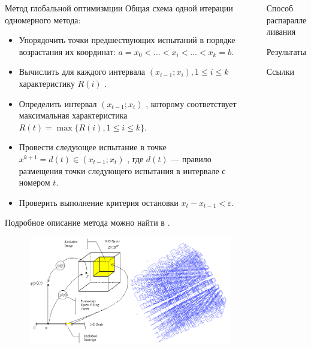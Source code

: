 \documentclass{beamer}
\begin{document}
\begin{frame}[t]
\begin{columns}[t]
\begin{column}[t]{0.48\paperwidth}
\begin{block}{Метод глобальной оптимизмции}
              Общая схема одной итерации одномерного метода:
              \begin{itemize}
                \justifying
                \item Упорядочить точки предшествующих испытаний в порядке возрастания их координат: \(a=x_{0}<...<x_{i}<...<x_{k}=b\).
                \item Вычислить для каждого интервала \((x_{i-1};x_{i}),1\leq i\leq k\)  характеристику \(R(i)\) .
                \item Определить интервал \((x_{t-1};x_{t})\) , которому соответствует максимальная характеристика \(R(t)=\max\{R(i),1\leq i\leq k\}\).
                \item Провести следующее испытание в точке \(x^{k+1}=d(t)\in (x_{t-1};x_{t})\) , где \(d(t)\)  — правило размещения точки следующего испытания в интервале с номером \(t\).
                \item Проверить выполнение критерия остановки \(x_{t}-x_{t-1}<\varepsilon\).
              \end{itemize}
              Подробное описание метода можно найти в \cite{optParallelBook}.

              \begin{minipage}[t]{.48\textwidth}
              \begin{figure}
                  \centering
                  \includegraphics[scale=1.27]{images/peano.png}
              \end{figure}
              \end{minipage}

            \end{block}
        \end{column}
        \begin{column}[t]{0.48\paperwidth}
          \begin{block}{Способ распараллеливания}

          \end{block}
            \begin{block}{Результаты}
            \end{block}
            \begin{block}{Ссылки}
              \printbibliography
            \end{block}
        \end{column}
    \end{columns}
\end{frame}
\end{document}
